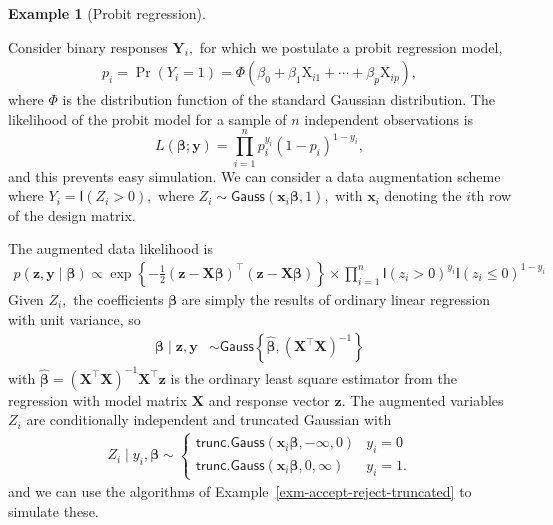\documentclass[
  11pt,
  letterpaper,
]{scrbook}
\theoremstyle{definition}
\theoremstyle{definition}
\newtheorem{example}{Example}[chapter]
\theoremstyle{definition}
\theoremstyle{plain}
\theoremstyle{plain}
\theoremstyle{plain}
\theoremstyle{remark}
\begin{document}
\begin{example}[Probit
regression]\protect\hypertarget{exm-probit-regression}{}\label{exm-probit-regression}

Consider binary responses \(\boldsymbol{Y}_i,\) for which we postulate a
probit regression model, \begin{align*}
p_i = \Pr(Y_i=1) = \Phi(\beta_0 + \beta_1 \mathrm{X}_{i1} + \cdots + \beta_p\mathrm{X}_{ip}),
\end{align*} where \(\Phi\) is the distribution function of the standard
Gaussian distribution. The likelihood of the probit model for a sample
of \(n\) independent observations is
\[L(\boldsymbol{\beta}; \boldsymbol{y}) = \prod_{i=1}^n p_i^{y_i}(1-p_i)^{1-y_i},\]
and this prevents easy simulation. We can consider a data augmentation
scheme where \(Y_i = \mathsf{I}(Z_i > 0),\) where
\(Z_i \sim \mathsf{Gauss}(\mathbf{x}_i\boldsymbol{\beta}, 1),\) with
\(\mathbf{x}_i\) denoting the \(i\)th row of the design matrix.

The augmented data likelihood is \begin{align*}
p(\boldsymbol{z}, \boldsymbol{y} \mid \boldsymbol{\beta}) \propto \exp\left\{-\frac{1}{2}(\boldsymbol{z} - \mathbf{X}\boldsymbol{\beta})^\top(\boldsymbol{z} - \mathbf{X}\boldsymbol{\beta})\right\} \times \prod_{i=1}^n \mathsf{I}(z_i > 0)^{y_i}\mathsf{I}(z_i \le 0)^{1-y_i}
\end{align*} Given \(Z_i,\) the coefficients \(\boldsymbol{\beta}\) are
simply the results of ordinary linear regression with unit variance, so
\begin{align*}
\boldsymbol{\beta} \mid \boldsymbol{z}, \boldsymbol{y} &\sim \mathsf{Gauss}\left\{\widehat{\boldsymbol{\beta}}, (\mathbf{X}^\top\mathbf{X})^{-1}\right\}
\end{align*} with
\(\widehat{\boldsymbol{\beta}}=(\mathbf{X}^\top\mathbf{X})^{-1}\mathbf{X}^\top\boldsymbol{z}\)
is the ordinary least square estimator from the regression with model
matrix \(\mathbf{X}\) and response vector \(\boldsymbol{z}.\) The
augmented variables \(Z_i\) are conditionally independent and truncated
Gaussian with \begin{align*}
Z_i \mid y_i, \boldsymbol{\beta} \sim \begin{cases}
\mathsf{trunc. Gauss}(\mathbf{x}_i\boldsymbol{\beta}, -\infty, 0) & y_i =0 \\
\mathsf{trunc. Gauss}(\mathbf{x}_i\boldsymbol{\beta}, 0, \infty) & y_i =1.
\end{cases}
\end{align*} and we can use the algorithms of
Example~\ref{exm-accept-reject-truncated} to simulate these.


\end{example}
\end{document}
